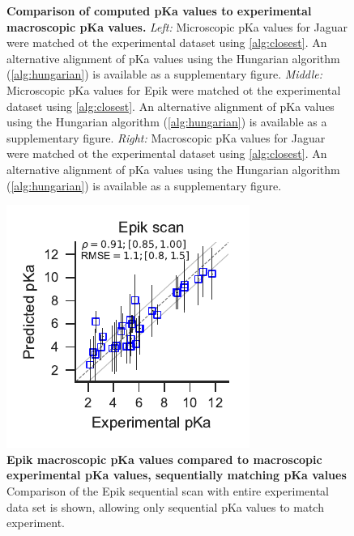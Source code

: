 \documentclass[9pt,lineno,final]{elife}
\begin{document}
\begin{figure}[hbtp]
\caption{{\bf Comparison of computed pKa values to experimental macroscopic pKa values.} {\it Left:} Microscopic pKa values for Jaguar were matched ot the experimental dataset using \cref{alg:closest}. An alternative alignment of pKa values using the Hungarian algorithm (\cref{alg:hungarian}) is available as a supplementary figure.
{\it Middle:} Microscopic pKa values for Epik were matched ot the experimental dataset using \cref{alg:closest}. An alternative alignment of pKa values using the Hungarian algorithm (\cref{alg:hungarian}) is available as a supplementary figure.
{\it Right:} Macroscopic pKa values for Jaguar were matched ot the experimental dataset using \cref{alg:closest}. An alternative alignment of pKa values using the Hungarian algorithm (\cref{alg:hungarian}) is available as a supplementary figure. \label{correlation-closest}}


\end{figure}

%


\begin{figure}[hbtp]
	\centering
	\includegraphics[scale=1.2]{aligned_pka_epik_scan.pdf}	
	\caption{{\bf Epik macroscopic pKa values compared to macroscopic experimental pKa values, sequentially matching pKa values}
		Comparison of the Epik sequential scan with entire experimental data set is shown, allowing only sequential pKa values to match experiment.\label{fig:correlation-sequential}}
\end{figure}
    
\end{document}
